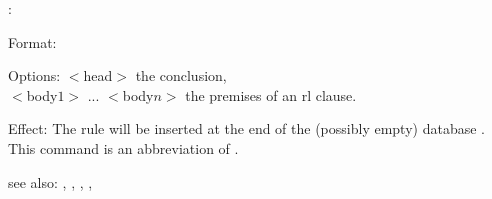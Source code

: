\azrl:

Format: 

Options: $<$head$>$ the conclusion,\\
         $<$body$1>$ ... $<$body$n>$ the premises of an rl clause.

Effect: The rule  will be inserted at the end of the 
	(possibly empty) database .
        This command is an abbreviation of .

see also: \az, \azup, \consult, \destroy, \replace
